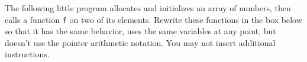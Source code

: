 \clearpage
\bgroup
\newcommand{\arrTP}{int}%
\newcommand{\arrONE}{X}%
\newcommand{\arrTWO}{AUX}%
\newcommand{\arrSize}{27}%
\newcommand{\IO}{3}%
\newcommand{\IA}{5}%
\newcommand{\IB}{13}%
\newcommand{\IAA}{\setcounter{cnt}{\IA - \IO}\arabic{cnt}}
\newcommand{\IBB}{\setcounter{cnt}{\IB - \IO}\arabic{cnt}}
\newcommand{\vA}{\setcounter{cnt}{42 - \IA}\arabic{cnt}}
\newcommand{\vB}{\setcounter{cnt}{42 - (\IB - \IO)}\arabic{cnt}}

%

The following little program allocates and initializes an array of
numbers, then calls a function \lstinline'f' on two of its elements.
Rewrite these functions in the box below so that it has the same
behavior, uses the same variables at any point, but doesn't use the
pointer arithmetic notation.  You may not insert additional
instructions.

